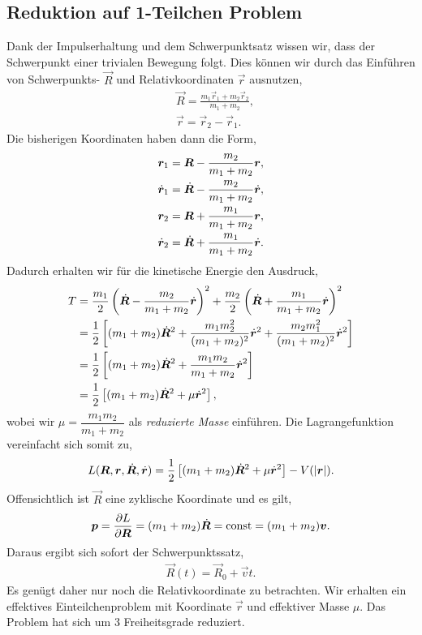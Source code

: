\subsection{Reduktion auf 1-Teilchen Problem}
Dank der Impulserhaltung und dem Schwerpunktsatz wissen wir, dass der
Schwerpunkt einer trivialen Bewegung folgt. Dies können wir durch das
Einführen von Schwerpunkts- $\vec{R}$ und Relativkoordinaten $\vec{r}$
ausnutzen,
\begin{align*}
&\vec{R} = \frac{m_1\vec{r}_1+m_2\vec{r}_2}{m_1+m_2},\\
&\vec{r} = \vec{r}_2-\vec{r}_1.
\end{align*}
Die bisherigen Koordinaten haben dann die Form,
\begin{align*}
&\bm{r}_1 = \bm{R} - \frac{m_2}{m_1+m_2}\bm{r},\\
&\dot{\bm{r}}_1 = \dot{\bm{R}} - \frac{m_2}{m_1+m_2}\dot{\bm{r}},\\
&\bm{r}_2 = \bm{R} + \frac{m_1}{m_1+m_2}\bm{r},\\
&\dot{\bm{r}}_2 = \dot{\bm{R}} + \frac{m_1}{m_1+m_2}\dot{\bm{r}}.
\end{align*}
Dadurch erhalten wir für die kinetische Energie den Ausdruck,
\begin{align*}
T &= \frac{m_1}{2}\left(\dot{\bm{R}} - \frac{m_2}{m_1+m_2}\dot{\bm{r}}\right)^2
+ \frac{m_2}{2}\left(\dot{\bm{R}} + \frac{m_1}{m_1+m_2}\dot{\bm{r}}\right)^2\\
&= \frac{1}{2}\left[(m_1+m_2)\dot{\bm{R}}^2 + \frac{m_1m_2^2}{(m_1+m_2)^2}\dot{\bm{r}}^2
+ \frac{m_2m_1^2}{(m_1+m_2)^2}\dot{\bm{r}}^2\right]\\
&= \frac{1}{2}\left[(m_1+m_2)\dot{\bm{R}}^2 +
\frac{m_1m_2}{m_1+m_2}\dot{\bm{r}}^2\right]\\
&= \frac{1}{2}\left[(m_1+m_2)\dot{\bm{R}}^2 +
\mu\dot{\bm{r}}^2\right],
\end{align*}
wobei wir $\mu=\dfrac{m_1m_2}{m_1+m_2}$ als \emph{reduzierte Masse} einführen.
Die Lagrangefunktion vereinfacht sich somit zu,
\begin{align*}
L(\bm{R},\bm{r},\dot{\bm{R}},\dot{\bm{r}}) = \frac{1}{2}\left[(m_1+m_2)\dot{\bm{R}}^2 +
\mu\dot{\bm{r}}^2\right] - V(\left|\bm{r}\right|).
\end{align*}
Offensichtlich ist $\vec{R}$ eine zyklische Koordinate und es gilt,
\begin{align*}
\bm{p} = \frac{\partial L}{\partial \bm{R}} = (m_1+m_2)\dot{\bm{R}} =\mathrm{const} =
(m_1+m_2)\bm{v}.
\end{align*}
Daraus ergibt sich sofort der Schwerpunktssatz,
\begin{align*}
\vec{R}(t) = \vec{R}_0 + \vec{v}t.
\end{align*}
Es genügt daher nur noch die Relativkoordinate zu betrachten. Wir erhalten ein
effektives Einteilchenproblem mit Koordinate $\vec{r}$ und effektiver Masse
$\mu$. Das Problem hat sich um 3 Freiheitsgrade reduziert.

